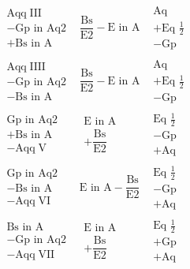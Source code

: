 \documentclass[11pt,a4paper]{article}
\begin{document}
\[\begin{array}{l|l|l}
\begin{array}{l} \text{Aqq} \;\text{III} \\ -\text{Gp in Aq2} \\ +\text{Bs in A} \end{array} & \dfrac{\text{Bs}}{\text{E2}} - \text{E in A} & \begin{array}{l} \text{Aq} \\ +\text{Eq } \tfrac{1}{2} \\ -\text{Gp} \end{array} \\ \hline
\begin{array}{l} \text{Aqq} \;\text{IIII} \\ -\text{Gp in Aq2} \\ -\text{Bs in A} \end{array} & \dfrac{\text{Bs}}{\text{E2}} - \text{E in A} & \begin{array}{l} \text{Aq} \\ +\text{Eq } \tfrac{1}{2} \\ -\text{Gp} \end{array} \\ \hline
\begin{array}{l} \text{Gp in Aq2} \\ +\text{Bs in A} \\ -\text{Aqq} \;\text{V} \end{array} & \begin{array}{l} \text{E in A} \\ +\dfrac{\text{Bs}}{\text{E2}} \end{array} & \begin{array}{l} \text{Eq } \tfrac{1}{2} \\ -\text{Gp} \\ +\text{Aq} \end{array} \\ \hline
\begin{array}{l} \text{Gp in Aq2} \\ -\text{Bs in A} \\ -\text{Aqq} \;\text{VI} \end{array} & \text{E in A} - \dfrac{\text{Bs}}{\text{E2}} & \begin{array}{l} \text{Eq } \tfrac{1}{2} \\ -\text{Gp} \\ +\text{Aq} \end{array} \\ \hline
\begin{array}{l} \text{Bs in A} \\ -\text{Gp in Aq2} \\ -\text{Aqq} \;\text{VII} \end{array} & \begin{array}{l} \text{E in A} \\ +\dfrac{\text{Bs}}{\text{E2}} \end{array} & \begin{array}{l} \text{Eq } \tfrac{1}{2} \\ +\text{Gp} \\ +\text{Aq} \end{array}
\end{array} \]
\end{document}
